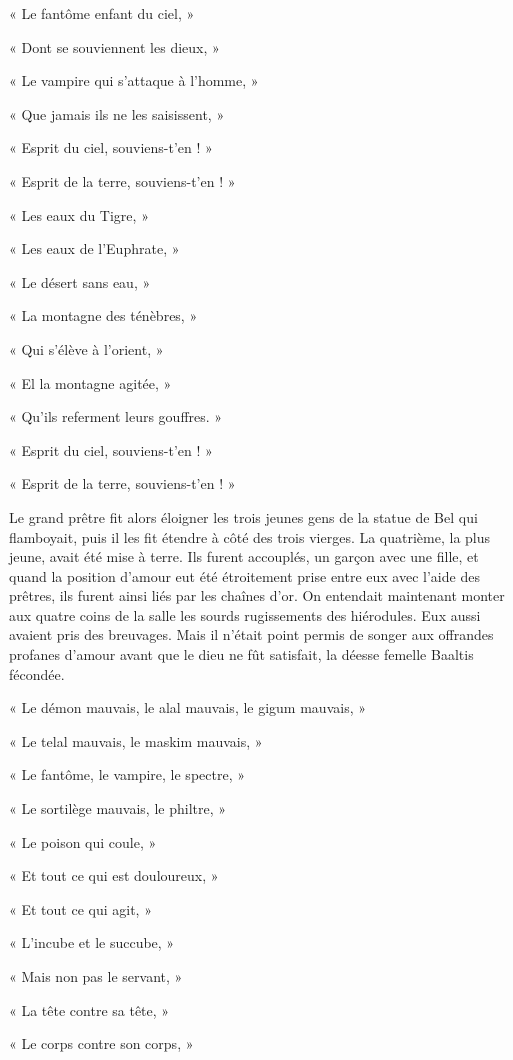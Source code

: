 \documentclass[a4paper, 11pt, oneside, polutonikogreek, french]{article}
\begin{document}
« Le fantôme enfant du ciel, »

« Dont se souviennent les dieux, »

« Le vampire qui s'attaque à l'homme, »

« Que jamais ils ne les saisissent, »

« Esprit du ciel, souviens-t'en ! »

« Esprit de la terre, souviens-t'en ! »

« Les eaux du Tigre, »

« Les eaux de l'Euphrate, »

« Le désert sans eau, »

« La montagne des ténèbres, »

« Qui s'élève à l'orient, »

« El la montagne agitée, »

« Qu'ils referment leurs gouffres. »

« Esprit du ciel, souviens-t'en ! »

« Esprit de la terre, souviens-t'en ! »

Le grand prêtre fit alors éloigner les trois jeunes gens de la statue de Bel qui flamboyait, puis il les fit étendre à côté des trois vierges. La quatrième, la plus jeune, avait été mise à terre. Ils furent accouplés, un garçon avec une fille, et quand la position d'amour eut été étroitement prise entre eux avec l'aide des prêtres, ils furent ainsi liés par les chaînes d'or. On entendait maintenant monter aux quatre coins de la salle les sourds rugissements des hiérodules. Eux aussi avaient pris des breuvages. Mais il n'était point permis de songer aux offrandes profanes d'amour avant que le dieu ne fût satisfait, la déesse femelle Baaltis fécondée.

« Le démon mauvais, le alal mauvais, le gigum mauvais, »

« Le telal mauvais, le maskim mauvais, »

« Le fantôme, le vampire, le spectre, »

« Le sortilège mauvais, le philtre, »

« Le poison qui coule, »

« Et tout ce qui est douloureux, »

« Et tout ce qui agit, »

« L'incube et le succube, »

« Mais non pas le servant, »

« La tête contre sa tête, »

« Le corps contre son corps, »
\end{document}
